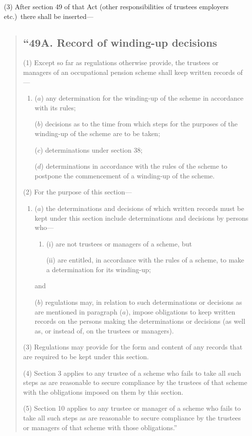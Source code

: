 \documentclass[12pt,a4paper]{article}
\begin{document}
(3) After section 49 of that Act (other responsibilities of trustees employers etc.)\ there shall be inserted—
\begin{quotation}
\subsection*{“49A. Record of winding-up decisions}

(1) Except so far as regulations otherwise provide, the trustees or managers of an occupational pension scheme shall keep written records of—
\begin{enumerate}\item[]
($a$) any determination for the winding-up of the scheme in accordance with its rules;

($b$) decisions as to the time from which steps for the purposes of the winding-up of the scheme are to be taken;

($c$) determinations under section 38;

($d$) determinations in accordance with the rules of the scheme to postpone the commencement of a winding-up of the scheme.
\end{enumerate}

(2) For the purpose of this section—
\begin{enumerate}\item[]
($a$) the determinations and decisions of which written records must be kept under this section include determinations and decisions by persons who—
\begin{enumerate}\item[]
(i) are not trustees or managers of a scheme, but

(ii) are entitled, in accordance with the rules of a scheme, to make a determination for its winding-up;
\end{enumerate}
and

($b$) regulations may, in relation to such determinations or decisions as are mentioned in paragraph ($a$), impose obligations to keep written records on the persons making the determinations or decisions (as well as, or instead of, on the trustees or managers).
\end{enumerate}

(3) Regulations may provide for the form and content of any records that are required to be kept under this section.

(4) Section 3 applies to any trustee of a scheme who fails to take all such steps as are reasonable to secure compliance by the trustees of that scheme with the obligations imposed on them by this section.

(5) Section 10 applies to any trustee or manager of a scheme who fails to take all such steps as are reasonable to secure compliance by the trustees or managers of that scheme with those obligations.”
\end{quotation}
\end{document}

